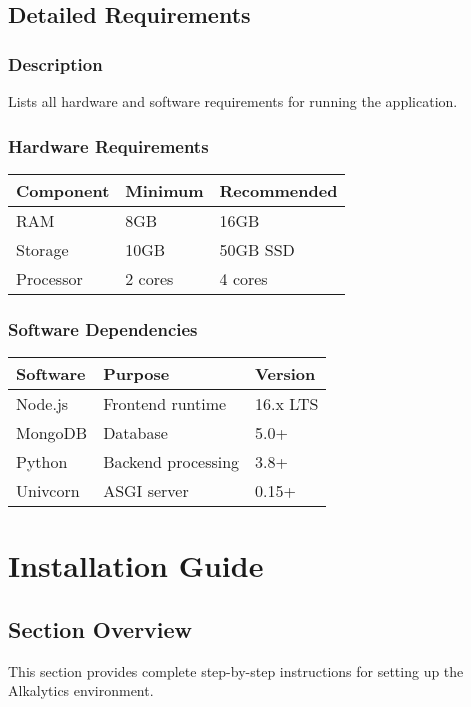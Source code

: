 \documentclass[12pt]{article}
\begin{document}
\subsection{Detailed Requirements}
\subsubsection*{Description}
Lists all hardware and software requirements for running the application.

\subsubsection{Hardware Requirements}
\begin{table}[H]
    \centering
    \begin{tabularx}{\textwidth}{llX}
        \toprule
        \textbf{Component} & \textbf{Minimum} & \textbf{Recommended} \\
        \midrule
        RAM & 8GB & 16GB \\
        Storage & 10GB & 50GB SSD \\
        Processor & 2 cores & 4 cores \\
        \bottomrule
    \end{tabularx}
\end{table}

\subsubsection{Software Dependencies}
\begin{table}[H]
    \centering
    \begin{tabularx}{\textwidth}{lXl}
        \toprule
        \textbf{Software} & \textbf{Purpose} & \textbf{Version} \\
        \midrule
        Node.js & Frontend runtime & 16.x LTS \\
        MongoDB & Database & 5.0+ \\
        Python & Backend processing & 3.8+ \\
        Univcorn & ASGI server & 0.15+ \\
        \bottomrule
    \end{tabularx}
\end{table}

\section{Installation Guide}
\subsection*{Section Overview}
This section provides complete step-by-step instructions for setting up the
Alkalytics environment.
\end{document}
